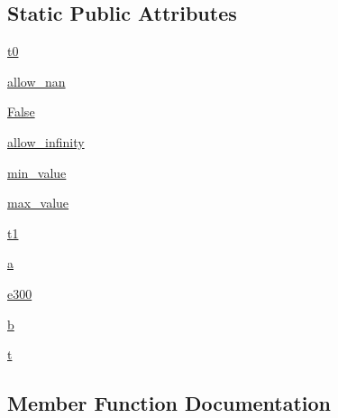 \subsection*{Static Public Attributes}
\begin{DoxyCompactItemize}
\item 
\hyperlink{classnumpy_1_1lib_1_1tests_1_1test__function__base_1_1TestLerp_a8411b6619abc99ccbc5ad2196121dd52}{t0}
\item 
\hyperlink{classnumpy_1_1lib_1_1tests_1_1test__function__base_1_1TestLerp_aeecb6aeac478e395169340c109eb3567}{allow\+\_\+nan}
\item 
\hyperlink{classnumpy_1_1lib_1_1tests_1_1test__function__base_1_1TestLerp_a051ed96c5915dbd5b760a6b350ecaed3}{False}
\item 
\hyperlink{classnumpy_1_1lib_1_1tests_1_1test__function__base_1_1TestLerp_a3dc4f158778b46d5f6ff1212e4437526}{allow\+\_\+infinity}
\item 
\hyperlink{classnumpy_1_1lib_1_1tests_1_1test__function__base_1_1TestLerp_a59102ca218fd78f8e69660fbaa941745}{min\+\_\+value}
\item 
\hyperlink{classnumpy_1_1lib_1_1tests_1_1test__function__base_1_1TestLerp_a305ad273ac78428760b120d5a02fa75d}{max\+\_\+value}
\item 
\hyperlink{classnumpy_1_1lib_1_1tests_1_1test__function__base_1_1TestLerp_aebb5433a000c1cdf987621b19a5cca7e}{t1}
\item 
\hyperlink{classnumpy_1_1lib_1_1tests_1_1test__function__base_1_1TestLerp_ab38ebddd047713bf89f36174038e89c0}{a}
\item 
\hyperlink{classnumpy_1_1lib_1_1tests_1_1test__function__base_1_1TestLerp_aa50e1abcae72a79683bd0e897fada0b8}{e300}
\item 
\hyperlink{classnumpy_1_1lib_1_1tests_1_1test__function__base_1_1TestLerp_ad2247a2c16c46a05157936a2d502efcb}{b}
\item 
\hyperlink{classnumpy_1_1lib_1_1tests_1_1test__function__base_1_1TestLerp_afc00202dfef407d298e53f76b300d2ad}{t}
\end{DoxyCompactItemize}


\subsection{Member Function Documentation}
\mbox{\label{classnumpy_1_1lib_1_1tests_1_1test__function__base_1_1TestLerp_a4ff02783a51cd8f6d0ce678152832d16}} 
